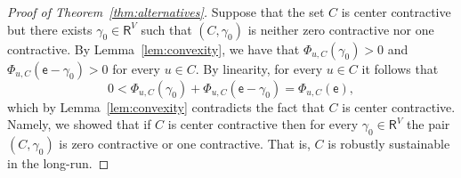 \documentclass[letterpaper,11pt]{article}
\newcommand{\RR}{\mathsf{R}}
\begin{document}
\begin{proof}[Proof of Theorem~\ref{thm:alternatives}]
Suppose that the set $C$ is center contractive but there exists $\gamma_0\in \RR^V$ such that $(C,\gamma_0)$ is neither zero contractive nor one contractive.
By Lemma~\ref{lem:convexity}, we have that $\Phi_{u,C}(\gamma_0)> 0$ and $\Phi_{u,C}(\mathsf{e}-\gamma_0)> 0$ for every $u\in C$.
By linearity, for every $u\in C$ it follows that 
\begin{equation*}
0<\Phi_{u,C}(\gamma_0)+\Phi_{u,C}(\mathsf{e}-\gamma_0)=\Phi_{u,C}(\mathsf{e}),
\end{equation*}
which by Lemma~\ref{lem:convexity} contradicts the fact that $C$ is center contractive.
Namely, we showed that if $C$ is center contractive then for every $\gamma_0\in \RR^V$ the pair $(C,\gamma_0)$ is zero contractive or one contractive. 
That is, $C$ is robustly sustainable in the long-run.
\end{proof}
\end{document}
